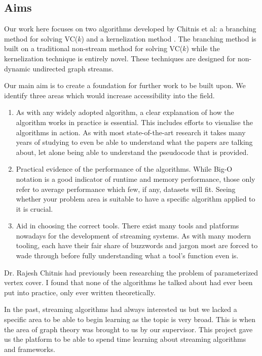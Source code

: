 \subsection{Aims}

Our work here focuses on two algorithms developed by Chitnis et al: a branching
method for solving VC(\(k\)) \cite{chitnis2019towards} and a kernelization
method \cite{chitnis2015parameterized}. The branching method is built on a
traditional non-stream method for solving VC(\(k\)) while the kernelization
technique is entirely novel. These techniques are designed for non-dynamic
undirected graph streams.

Our main aim is to create a foundation for further work to be built upon. We
identify three areas which would increase accessibility into the field.

\begin{enumerate}
    \item
          As with any widely adopted algorithm, a clear explanation of how the
          algorithm works in practice is essential. This includes efforts to
          visualise the algorithms in action. As with most state-of-the-art
          research it takes many years of studying to even be able to
          understand what the papers are talking about, let alone being able to
          understand the pseudocode that is provided.
    \item
          Practical evidence of the performance of the algorithms. While Big-O
          notation is a good indicator of runtime and memory performance, those
          only refer to average performance which few, if any, datasets will
          fit. Seeing whether your problem area is suitable to have a specific
          algorithm applied to it is crucial.
    \item
          Aid in choosing the correct tools. There exist many tools and
          platforms nowadays for the development of streaming systems. As with
          many modern tooling, each have their fair share of buzzwords and
          jargon most are forced to wade through before fully understanding
          what a tool's function even is.
\end{enumerate}

Dr. Rajesh Chitnis had previously been researching the problem of parameterized
vertex cover. I found that none of the algorithms he talked about had ever been
put into practice, only ever written theoretically.

In the past, streaming algorithms had always interested us but we lacked a
specific area to be able to begin learning as the topic is very broad. This is
when the area of graph theory was brought to us by our supervisor. This project
gave us the platform to be able to spend time learning about streaming
algorithms and frameworks.
